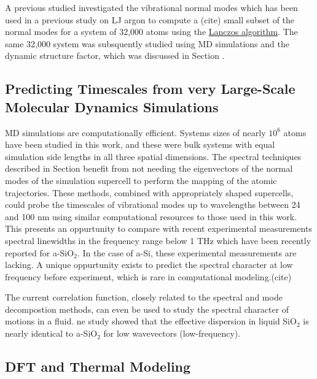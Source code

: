 A previous studied investigated the vibrational normal modes 
which has been used in a previous study on LJ argon to compute a 
(cite) 
small subset of the normal modes for a system of 32,000 atoms
\cite{mazzacurati_low-frequency_1996} 
using the 
\href{http://en.wikipedia.org/wiki/Lanczos_algorithm}
{Lanczos algorithm}.\cite{golub_matrix_2012} 
The same 32,000 system was subsquently studied using MD simulations 
and the dynamic structure factor,\cite{ruocco_relaxation_2000} 
which was discussed in Section .

\subsection{Predicting Timescales from very Large-Scale Molecular Dynamics 
Simulations}

MD simulations are computationally efficient.  Systems sizes of nearly 
$10^6$ atoms have been studied in this work, and these were bulk systems 
with equal simulation side lengths in all three spatial dimensions. 
The spectral techniques described in Section benefit from not needing 
the eigenvectors of the normal modes of the simulation supercell to 
perform the mapping of the atomic trajectories. These methods, 
combined with appropriately shaped supercells, could probe the 
timescales of vibrational modes up to wavelengths between 
24 and 100 nm using similar computational resources to those 
used in this work. 
This presents an oppurtunity to compare with recent experimental 
measurements spectral linewidths in the frequency range below 
1 THz which have been recently reported for a-SiO$_2$. 
In the case of a-Si, these experimental measurements 
are lacking.\cite{hondongwa_ultrasonic_2011} 
A unique oppurtunity exists to predict the spectral character 
at low frequency before experiment, which is rare in computational 
modeling.(cite)

The current correlation function, closely related to the spectral and 
mode decompostion methods, can even be used to study the spectral 
character of motions in a fluid.\cite{boom_molecular_1980}  
ne study showed that the 
effective dispersion in liquid SiO$_2$ is nearly identical to 
a-SiO$_2$ for low wavevectors (low-frequency).\cite{horbach_high_2001} 

\subsection{DFT and Thermal Modeling}

